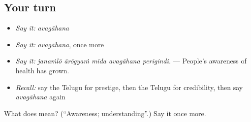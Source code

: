 \subsection*{Your turn}
\begin{itemize}
\raggedright
  \item \emph{Say it:} \emph{avagāhana}
  \item \emph{Say it:} \emph{avagāhana}, once more
  \item \emph{Say it:} \emph{janaṁlō ārōgyaṁ mīda avagāhana perigindi.} — People’s awareness of health has grown.
  \item \emph{Recall:} say the Telugu for prestige, then the Telugu for credibility, then say \emph{avagāhana} again
\end{itemize}

\begin{tcolorbox}[breakable,colback=teal!4,colframe=teal!35!black,title={Before you move on}]
What does  mean? (\textquotedblleft{}Awareness; understanding\textquotedblright{}.) Say it once more.
\end{tcolorbox}
